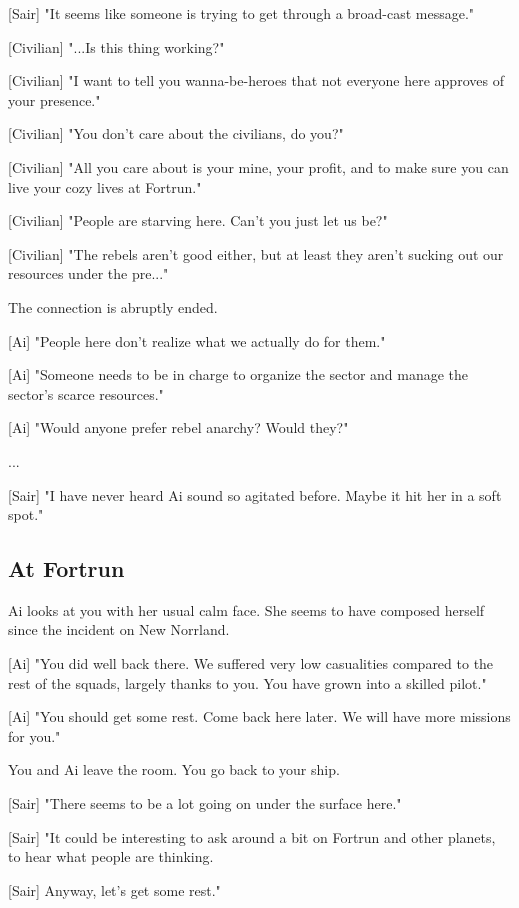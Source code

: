 \documentclass[a4paper,12pt]{article}
\begin{document}
[Sair] "It seems like someone is trying to get through a broad-cast message."

[Civilian] "...Is this thing working?" 

[Civilian] "I want to tell you wanna-be-heroes that not everyone here
approves of your presence." 

[Civilian] "You don't care about the civilians, do you?" 

[Civilian] "All you care about is your mine, your profit, and to make sure you can live your cozy lives at Fortrun."

[Civilian] "People are starving here. Can't you just let us be?"

[Civilian] "The rebels aren't good either, but at least they aren't sucking out our resources under the pre..." 

The connection is abruptly ended.

[Ai] "People here don't realize what we actually do for them."

[Ai] "Someone needs to be in charge to organize the sector and manage the sector's scarce resources."

[Ai] "Would anyone prefer rebel anarchy? Would they?"

...

[Sair] "I have never heard Ai sound so agitated before. Maybe it hit her in a soft spot."

\subsection{At Fortrun}

Ai looks at you with her usual calm face. She seems to have composed herself since the incident on New Norrland.

[Ai] "You did well back there. We suffered very low casualities compared
to the rest of the squads, largely thanks to you. You have grown into a skilled pilot." 

[Ai] "You should get some rest. Come back here later. We will have more missions for you."

You and Ai leave the room. You go back to your ship.

[Sair] "There seems to be a lot going on under the surface here." 

[Sair] "It could be interesting to ask around a bit on Fortrun and other planets, to hear what people are thinking. 

[Sair] Anyway, let's get some rest."
\end{document}
